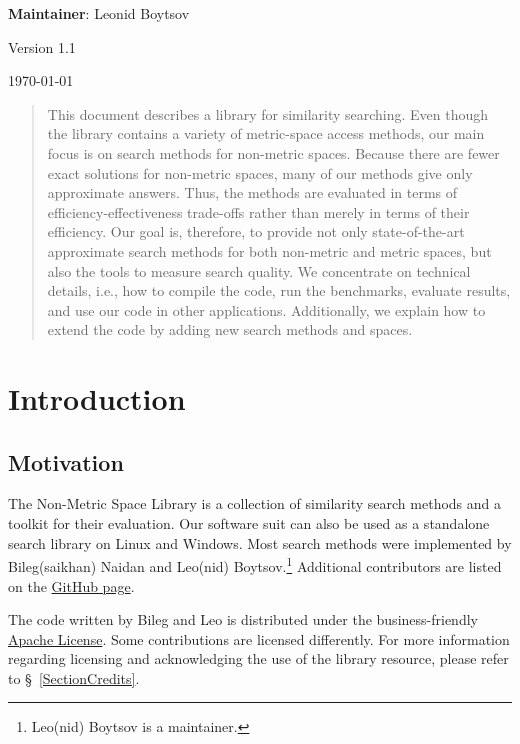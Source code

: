 \documentclass[runningheads,a4paper]{llncs}
\begin{document}
{\begin{center}{\small \textbf{Maintainer}: Leonid Boytsov}\end{center}}
{\begin{center}{Version 1.1}\end{center} 
{\begin{center}{{\today}}\end{center}}

\begin{abstract}
This document describes a library for similarity searching.
Even though the library contains a variety of metric-space access methods,
our main focus is on search methods for non-metric spaces.
Because there are fewer exact solutions for non-metric spaces,
many of our methods give only approximate answers. 
Thus, the methods
are evaluated in terms of efficiency-effectiveness trade-offs
rather than merely in terms of their efficiency.
Our goal is, therefore, to provide
not only state-of-the-art approximate search methods for 
both non-metric and metric spaces,
but also the tools to measure search quality.
We concentrate on technical details, i.e., 
how to compile the code, run the benchmarks, evaluate results,
and use our code in other applications.
Additionally, we explain how to extend the code by adding
new search methods and spaces.
\end{abstract}

\section{Introduction}
\subsection{Motivation}
The Non-Metric Space Library is a collection of
similarity search methods and a toolkit for their evaluation.
Our software suit can also be used as a standalone search library on Linux and Windows. 
Most search methods were implemented by Bileg(saikhan) Naidan and Leo(nid) Boytsov.\footnote{Leo(nid) Boytsov is a maintainer.}
Additional contributors are listed on the \href{https://github.com/searchivarius/NonMetricSpaceLib}{GitHub 
page}.

The code written by Bileg and Leo is distributed under the business-friendly \href{http://apache.org/licenses/LICENSE-2.0}{Apache License}. 
Some contributions are licensed differently.
For more information regarding licensing and acknowledging the use of the library
resource, please refer to \S~\ref{SectionCredits}.

}
\end{document}
